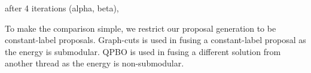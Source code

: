 after 4 iterations (alpha, beta),

%
%
%
%
To make the comparison simple, we restrict our proposal
generation to be constant-label proposals. Graph-cuts is used in fusing
a constant-label proposal as the energy is submodular. QPBO is used in
fusing a different solution from another thread as the energy is
non-submodular.
%
